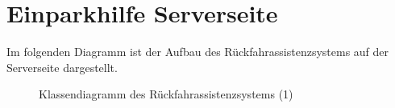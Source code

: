 \documentclass[entwurf.tex]{subfiles}
\begin{document}
  	\section{Einparkhilfe Serverseite}
		Im folgenden Diagramm ist der Aufbau des Rückfahrassistenzsystems auf der Serverseite dargestellt.
		\begin{figure}[H]
  			\caption{Klassendiagramm des Rückfahrassistenzsystems (1)}
  		\end{figure}
  		
  	\newpage
\end{document}
